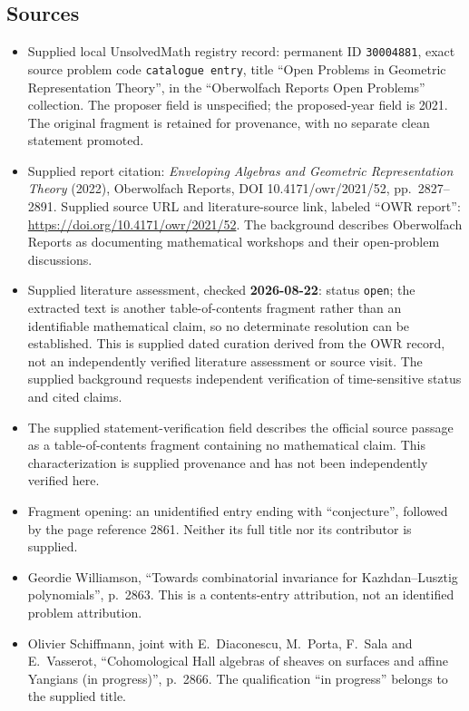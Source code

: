 \documentclass[11pt]{article}
\begin{document}
\subsection{Sources}
\begin{itemize}
\item Supplied local UnsolvedMath registry record: permanent ID \texttt{30004881}, exact source problem code \texttt{catalogue entry}, title ``Open Problems in Geometric Representation Theory'', in the ``Oberwolfach Reports Open Problems'' collection. The proposer field is unspecified; the proposed-year field is 2021. The original fragment is retained for provenance, with no separate clean statement promoted.
\item Supplied report citation: \emph{Enveloping Algebras and Geometric Representation Theory} (2022), Oberwolfach Reports, DOI 10.4171/owr/2021/52, pp.~2827--2891. Supplied source URL and literature-source link, labeled ``OWR report'': \url{https://doi.org/10.4171/owr/2021/52}. The background describes Oberwolfach Reports as documenting mathematical workshops and their open-problem discussions.
\item Supplied literature assessment, checked \textbf{2026-08-22}: status \texttt{open}; the extracted text is another table-of-contents fragment rather than an identifiable mathematical claim, so no determinate resolution can be established. This is supplied dated curation derived from the OWR record, not an independently verified literature assessment or source visit. The supplied background requests independent verification of time-sensitive status and cited claims.
\item The supplied statement-verification field describes the official source passage as a table-of-contents fragment containing no mathematical claim. This characterization is supplied provenance and has not been independently verified here.
\item Fragment opening: an unidentified entry ending with ``conjecture'', followed by the page reference 2861. Neither its full title nor its contributor is supplied.
\item Geordie Williamson, ``Towards combinatorial invariance for Kazhdan--Lusztig polynomials'', p.~2863. This is a contents-entry attribution, not an identified problem attribution.
\item Olivier Schiffmann, joint with E.~Diaconescu, M.~Porta, F.~Sala and E.~Vasserot, ``Cohomological Hall algebras of sheaves on surfaces and affine Yangians (in progress)'', p.~2866. The qualification ``in progress'' belongs to the supplied title.

\end{itemize}
\end{document}
